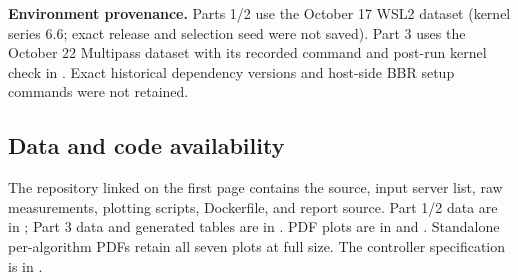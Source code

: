 \documentclass[11pt,letterpaper]{article}
\begin{document}
\textbf{Environment provenance.} Parts 1/2 use the October 17 WSL2 dataset
(kernel series 6.6; exact release and selection seed were not saved). Part 3 uses
the October 22 Multipass dataset with its recorded command and post-run kernel
check in . Exact historical dependency versions and host-side BBR setup commands were
not retained.

\subsection*{Data and code availability}
The repository linked on the first page contains the source, input server list,
raw measurements, plotting scripts, Dockerfile, and report source. Part 1/2 data
are in ; Part 3 data and generated tables are in
. PDF plots are in  and
. Standalone per-algorithm PDFs retain all seven plots
at full size. The controller specification is in
.
\end{document}
